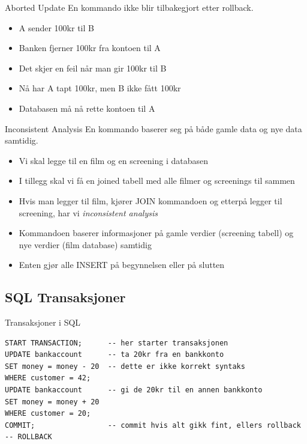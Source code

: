 \begin{frame}{}
    \begin{block}{Aborted Update}
    En kommando ikke blir tilbakegjort etter rollback.
    \end{block}
    \pause
    \begin{itemize}[<+->]
        \item A sender 100kr til B
        \item Banken fjerner 100kr fra kontoen til A
        \item Det skjer en feil når man gir 100kr til B
        \item Nå har A tapt 100kr, men B ikke fått 100kr
        \item Databasen må nå rette kontoen til A
    \end{itemize}
\end{frame}

\begin{frame}{}
    \begin{block}{Inconsistent Analysis}
    En kommando baserer seg på både gamle data og nye data samtidig.
    \end{block}
    \pause
    \begin{itemize}[<+->]
        \item Vi skal legge til en film og en screening i databasen
        \item I tillegg skal vi få en joined tabell med alle filmer og screenings til sammen
        \item Hvis man legger til film, kjører JOIN kommandoen og etterpå legger til screening, har vi \textit{inconsistent analysis}
        \item Kommandoen baserer informasjoner på gamle verdier (screening tabell) og nye verdier (film database) samtidig
        \item Enten gjør alle INSERT på begynnelsen eller på slutten
    \end{itemize}
\end{frame}

\subsection*{SQL Transaksjoner}
\begin{frame}[fragile]{Transaksjoner i SQL}
\begin{verbatim}
START TRANSACTION;      -- her starter transaksjonen
UPDATE bankaccount      -- ta 20kr fra en bankkonto 
SET money = money - 20  -- dette er ikke korrekt syntaks
WHERE customer = 42;
UPDATE bankaccount      -- gi de 20kr til en annen bankkonto
SET money = money + 20
WHERE customer = 20;
COMMIT;                 -- commit hvis alt gikk fint, ellers rollback
-- ROLLBACK
\end{verbatim}
\end{frame}

